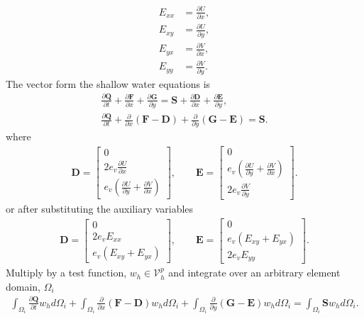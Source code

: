 \documentclass[11pt]{article}
\begin{document}
\begin{align}
E_{xx} &= \frac{\partial U}{\partial x}, \\
E_{xy} &= \frac{\partial U}{\partial y}, \\
E_{yx} &= \frac{\partial V}{\partial x}, \\
E_{yy} &= \frac{\partial V}{\partial y}.
\end{align}
The vector form the shallow water equations is 
\begin{gather}
\frac{\partial \mathbf{Q}}{\partial t} + \frac{\partial \mathbf{F}}{\partial x} + \frac{\partial \mathbf{G}}{\partial y} = \mathbf{S} + \frac{\partial\mathbf{D}}{\partial x} + \frac{\partial\mathbf{E}}{\partial y}, \\
\frac{\partial \mathbf{Q}}{\partial t} + \frac{\partial }{\partial x}\left(\mathbf{F}-\mathbf{D}\right) + \frac{\partial }{\partial y}\left(\mathbf{G} - \mathbf{E} \right) = \mathbf{S}.
\end{gather}
where
\begin{align}
\mathbf{D} = \begin{bmatrix} 0 \\ 2e_v\frac{\partial U}{\partial x} \\ e_v\left(\frac{\partial U}{\partial y} + \frac{\partial V}{\partial x}\right) \end{bmatrix}, \quad \quad \mathbf{E} = \begin{bmatrix} 0 \\ e_v\left(\frac{\partial U}{\partial y} + \frac{\partial V}{\partial x}\right) \\ 2e_v\frac{\partial V}{\partial y} \end{bmatrix}.
\end{align}
or after substituting the auxiliary variables
\begin{align}
\mathbf{D} = \begin{bmatrix} 0 \\ 2e_vE_{xx} \\ e_v\left(E_{xy} + E_{yx}\right) \end{bmatrix}, \quad \quad \mathbf{E} = \begin{bmatrix} 0 \\ e_v\left(E_{xy} + E_{yx}\right) \\ 2e_vE_{yy} \end{bmatrix}.
\end{align}
Multiply by a test function, $w_h \in \mathcal{V}_h^p$ and integrate over an arbitrary element domain, $\Omega_i$
\begin{gather}
\int_{\Omega_i}\frac{\partial \mathbf{Q}}{\partial t} w_h d\Omega_i+ \int_{\Omega_i}\frac{\partial }{\partial x}\left(\mathbf{F}-\mathbf{D}\right) w_h d\Omega_i+ \int_{\Omega_i}\frac{\partial }{\partial y}\left(\mathbf{G} - \mathbf{E} \right) w_h d\Omega_i= \int_{\Omega_i}\mathbf{S}w_h d\Omega_i.
\end{gather}
\end{document}
